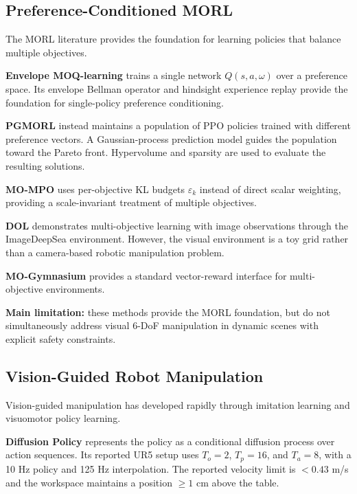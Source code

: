 \documentclass[journal]{IEEEtran}
\begin{document}

\subsection{Preference-Conditioned MORL}

The MORL literature provides the foundation for learning policies that
balance multiple objectives.

\textbf{Envelope MOQ-learning} \cite{yang2019} trains a single network
$Q(s,a,\omega)$ over a preference space. Its envelope Bellman operator
and hindsight experience replay provide the foundation for
single-policy preference conditioning.

\textbf{PGMORL} \cite{xu2020} instead maintains a population of PPO
policies trained with different preference vectors. A Gaussian-process
prediction model guides the population toward the Pareto front.
Hypervolume and sparsity are used to evaluate the resulting solutions.

\textbf{MO-MPO} \cite{abdolmaleki2022} uses per-objective KL budgets
$\varepsilon_k$ instead of direct scalar weighting, providing a
scale-invariant treatment of multiple objectives.

\textbf{DOL} \cite{mossalam} demonstrates multi-objective learning with
image observations through the ImageDeepSea environment. However, the
visual environment is a toy grid rather than a camera-based robotic
manipulation problem.

\textbf{MO-Gymnasium} \cite{felten2023} provides a standard vector-reward
interface for multi-objective environments.

\textbf{Main limitation:} these methods provide the MORL foundation,
but do not simultaneously address visual 6-DoF manipulation in dynamic
scenes with explicit safety constraints.


\subsection{Vision-Guided Robot Manipulation}

Vision-guided manipulation has developed rapidly through imitation
learning and visuomotor policy learning.

\textbf{Diffusion Policy} \cite{chi2023} represents the policy as a
conditional diffusion process over action sequences. Its reported UR5
setup uses $T_o=2$, $T_p=16$, and $T_a=8$, with a 10 Hz policy and
125 Hz interpolation. The reported velocity limit is $<0.43$ m/s and
the workspace maintains a position $\geq 1$ cm above the table.
\end{document}
